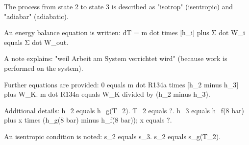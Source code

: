 The process from state 2 to state 3 is described as "isotrop" (isentropic) and "adiabar" (adiabatic).  

An energy balance equation is written:  
dT = m dot times [h_i] plus Σ dot W_i equals Σ dot W_out.  

A note explains: "weil Arbeit am System verrichtet wird" (because work is performed on the system).  

Further equations are provided:  
0 equals m dot R134a times [h_2 minus h_3] plus W_K.  
m dot R134a equals W_K divided by (h_2 minus h_3).  

Additional details:  
h_2 equals h_g(T_2).  
T_2 equals ?.  
h_3 equals h_f(8 bar) plus x times (h_g(8 bar) minus h_f(8 bar)); x equals ?.  

An isentropic condition is noted:  
s_2 equals s_3.  
s_2 equals s_g(T_2).